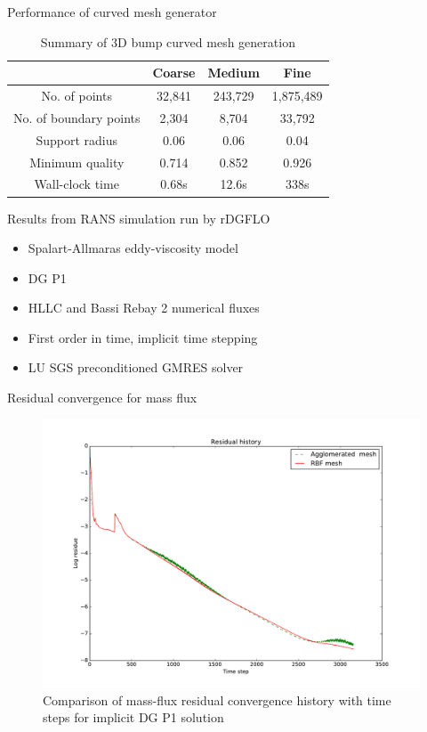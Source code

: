 \documentclass[t,12pt]{beamer}
\begin{document}
\begin{frame}{Performance of curved mesh generator}
	\begin{table}
		\centering
		\begin{tabular}{|c|c|c|c|}
			\hline
			& Coarse & Medium & Fine \\
			\hline
			No. of points 				& 32,841 & 243,729	& 1,875,489 \\
			No. of boundary points		& 2,304	& 8,704		& 33,792 \\
			Support radius				& 0.06	& 0.06		& 0.04 \\
			Minimum quality			& 0.714	& 0.852		& 0.926 \\
			Wall-clock time			& 0.68s	& 12.6s		& 338s \\
			\hline
		\end{tabular}
		\caption{Summary of 3D bump curved mesh generation}
	\end{table}
\end{frame}

\begin{frame}
Results from RANS simulation run by rDGFLO 
\begin{itemize}
	\item Spalart-Allmaras eddy-viscosity model
	\item DG P1
	\item HLLC and Bassi Rebay 2 numerical fluxes
	\item First order in time, implicit time stepping
	\item LU SGS preconditioned GMRES solver
\end{itemize}
\end{frame}

\begin{frame}{Residual convergence for mass flux}
\begin{figure}
	\centering
	\includegraphics[scale=0.27]{solver-convergence}
	\caption{Comparison of mass-flux residual convergence history with time steps for implicit DG P1 solution}
	\label{fig:resconvergence}
\end{figure}
\end{frame}
\end{document}
